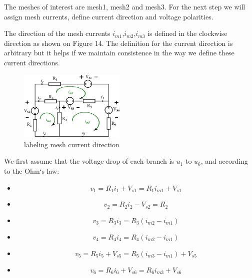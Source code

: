 \documentclass[a4 paper]{article}
\numberwithin{equation}{section}
\newcommand{\0}{\mathbf{0}}
\begin{document}
The meshes of interest are mesh1, mesh2 and mesh3.
For the next step we will assign mesh currents, define current direction and voltage polarities. 

The direction of the mesh currents $i_{m1}$,$i_{m2}$,$i_{m3}$ is defined in the clockwise direction as shown on Figure 14. The definition for the current direction is arbitrary but it helps if we maintain consistence in the way we define these current directions. 

\begin{figure}[ht!]
  \caption{labeling mesh current direction}
  \centering
  \hspace{5 mm}
  \includegraphics[width=0.45\textwidth]{./images/meshmethod}
\end{figure}

We first assume that the voltage drop of each branch is $u_1$ to $u_6$, and according to the Ohm`s law:

\begin{itemize} \itemsep1pt \parskip0pt  
  \item[] \hspace{6.6 cm}\begin{equation}v_1 = R_1i_1 + V_{s1} = R_1i_{m1} + V_{s1}\end{equation}
  \item[] \hspace{6.6 cm}\begin{equation}v_2 = R_2i_2 - V_{s2} = R_2\end{equation}
  \item[] \hspace{6.6 cm}\begin{equation}v_3 = R_3i_3 = R_3(i_{m2} - i_{m1})\end{equation}
  \item[] \hspace{6.6 cm}\begin{equation}v_4 = R_4i_4 = R_4(i_{m2}-i_{m1})\end{equation}
  \item[] \hspace{6.6 cm}\begin{equation}v_5 = R_5i_5 + V_{s5} = R_5(i_{m3}-i_{m1}) + V_{s5}\end{equation}
  \item[] \hspace{6.6 cm}\begin{equation}v_6 = R_6i_6 + V_{s6}= R_6i_{m3} + V_{s6}\end{equation}
\end{itemize}
\end{document}
